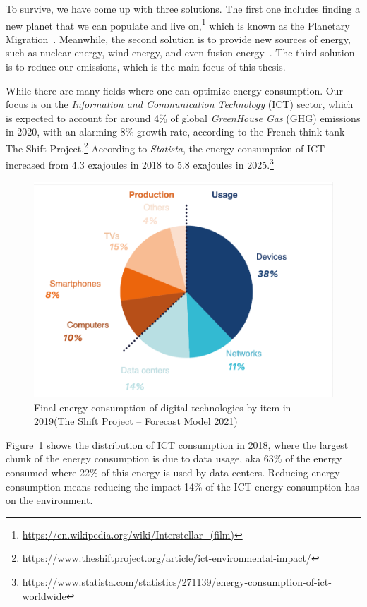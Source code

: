 To survive, we have come up with three solutions.
The first one includes finding a new planet that we can populate and live on,\footnote{\url{https://en.wikipedia.org/wiki/Interstellar_(film)}} which is known as the Planetary Migration~\cite{mapstone2022cyanobacteria}.
Meanwhile, the second solution is to provide new sources of energy, such as nuclear energy, wind energy, and even fusion energy~\cite{gross1984fusion}.
The third solution is to reduce our emissions, which is the main focus of this thesis.

While there are many fields where one can optimize energy consumption.
Our focus is on the \emph{Information and Communication Technology} (ICT) sector, which is expected to account for around 4\% of global \emph{GreenHouse Gas} (GHG) emissions in 2020, with an alarming 8\% growth rate, according to the French think tank The Shift Project.\footnote{\url{ https://www.theshiftproject.org/article/ict-environmental-impact/}}
According to \emph{Statista}, the energy consumption of ICT increased from 4.3 exajoules in 2018 to 5.8 exajoules in 2025.\footnote{\url{https://www.statista.com/statistics/271139/energy-consumption-of-ict-worldwide}}
\begin{figure}[!h]
    \centering
    \includegraphics[width=.7\linewidth]{chapters/distribution_of_ict_consumption.png}
    \caption{Final energy consumption of digital technologies by item in 2019(The Shift Project – Forecast Model 2021\cite{shift_2021})}
    \label{fig:distribution_of_ict_consumption}
\end{figure}

Figure~\ref{fig:distribution_of_ict_consumption} shows the distribution of ICT consumption in 2018, where the largest chunk of the energy consumption is due to data usage, aka 63\% of the energy consumed where 22\% of this energy is used by data centers.
Reducing energy consumption means reducing the impact 14\% of the ICT energy consumption has on the environment.

